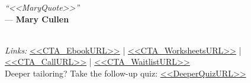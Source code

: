 \begin{pullquote}
\emph{“<<MaryQuote>>”}\\
\hfill — \textbf{Mary Cullen}
\end{pullquote}

\begin{CTAPanel}
\noindent
{}\quad
{}\quad
{}\quad
{}\\[3pt]
{\footnotesize
\textit{Links: }
\url{<<CTA_EbookURL>>} \quad|\quad
\url{<<CTA_WorksheetsURL>>} \quad|\quad
\url{<<CTA_CallURL>>} \quad|\quad
\url{<<CTA_WaitlistURL>>} \\
Deeper tailoring? Take the follow-up quiz: \url{<<DeeperQuizURL>>}
}
\end{CTAPanel}
